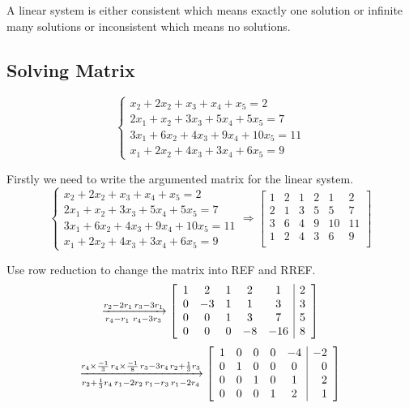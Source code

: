 \documentclass{article}
\begin{document}
A linear system is either consistent which means exactly one solution or infinite many solutions or inconsistent which means no solutions.

\subsection{Solving Matrix}
$$\left \{ \begin{array}{rcl}
	x_2+2x_2+x_3+x_4+x_5 = 2 \\
	2x_1 + x_2 + 3x_3 + 5x_4 + 5x_5 = 7 \\ 
	3x_1 + 6x_2 + 4x_3 + 9x_4 + 10x_5 = 11\\
	x_1 + 2x_2 + 4x_3 + 3x_4 +6x_5 = 9 \end{array}\right. $$
	
Firstly we need to write the argumented matrix for the linear system.
$$\left \{ \begin{array}{rcl}
	x_2+2x_2+x_3+x_4+x_5 = 2 \\
	2x_1 + x_2 + 3x_3 + 5x_4 + 5x_5 = 7 \\ 
	3x_1 + 6x_2 + 4x_3 + 9x_4 + 10x_5 = 11\\
	x_1 + 2x_2 + 4x_3 + 3x_4 +6x_5 = 9 \end{array}\right. \Longrightarrow
\left[\begin{array}{ccccc|r}
	1 & 2 & 1 & 2 & 1 & 2 \\
	2 & 1 & 3 & 5 & 5 & 7 \\
	3 & 6 & 4 & 9 & 10 & 11 \\
	1 & 2 & 4 & 3 & 6 & 9 \\
	\end{array} \right ]$$

Use row reduction to change the matrix into REF and RREF.
$$\xrightarrow[r_4-r_1\\ r_4-3r_3]{r_2-2r_1\\ r_3-3r_1}
\left[\begin{array}{ccccc|r}
	1 & 2 & 1 & 2 & 1 & 2 \\
	0 & -3 & 1 & 1 & 3 & 3 \\
	0 & 0 & 1 & 3 & 7 & 5 \\
	0 & 0 & 0 & -8 & -16 & 8 \\
	\end{array} \right ]$$
$$\xrightarrow[r_2 + \frac{1}{3}r_4\\ r_1-2r_2\\ r_1-r_3\\ r_1-2r_4]{r_4\times\frac{-1}{3}\\ r_4\times\frac{-1}{8} \\ r_3-3r_4 \\ r_2+\frac{1}{3}r_3}
\left[\begin{array}{ccccc|r}
	1 & 0 & 0 & 0 & -4 & -2 \\
	0 & 1 & 0 & 0 & 0 & 0 \\
	0 & 0 & 1 & 0 & 1 & 2 \\
	0 & 0 & 0 & 1 & 2 & 1 \\
	\end{array} \right ]
$$
\end{document}
